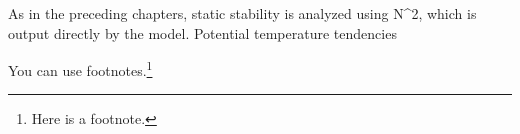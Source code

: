 As in the preceding chapters, static stability is analyzed using N^2, which is output directly by the model. Potential temperature tendencies 

You can use footnotes.\footnote{Here is a footnote.}
